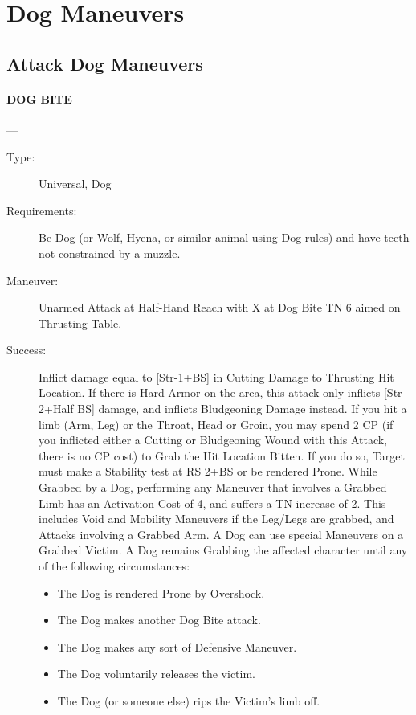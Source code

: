 \documentclass[oneside,11pt,english]{book}
\begin{document}
\section{Dog Maneuvers}
\subsection{Attack Dog Maneuvers}
\paragraph{\large\label{man:DOG BITE} DOG BITE}---\quad{\large[X]}
\vspace{-10pt}\begin{description} 
\item [Type:] Universal, Dog 
\item [Requirements:] Be Dog (or Wolf, Hyena, or similar animal using Dog rules) and have teeth not 
constrained by a muzzle. 
\item [Maneuver:] Unarmed Attack at Half-Hand Reach with X at Dog Bite TN 6 aimed on Thrusting Table. 
\item [Success:] Inflict damage equal to [Str-1+BS] in Cutting Damage to Thrusting Hit Location. If there is 
Hard Armor on the area, this attack only inflicts [Str-2+Half BS] damage, and inflicts Bludgeoning 
Damage instead. 
If you hit a limb (Arm, Leg) or the Throat, Head or Groin, you may spend 2 CP (if you inflicted either a 
Cutting or Bludgeoning Wound with this Attack, there is no CP cost) to Grab the Hit Location Bitten. If 
you do so, Target must make a Stability test at RS 2+BS or be rendered Prone. 
While Grabbed by a Dog, performing any Maneuver that involves a Grabbed Limb has an Activation 
Cost of 4, and suffers a TN increase of 2. This includes Void and Mobility Maneuvers if the Leg/Legs are 
grabbed, and Attacks involving a Grabbed Arm. A Dog can use special Maneuvers on a Grabbed Victim. 
A Dog remains Grabbing the affected character until any of the following circumstances: 
\begin{itemize}
\item The Dog is rendered Prone by Overshock. 
\item The Dog makes another Dog Bite attack. 
\item The Dog makes any sort of Defensive Maneuver. 
\item The Dog voluntarily releases the victim. 
\item The Dog (or someone else) rips the Victim’s limb off. 
\end{itemize}
\end{description}
\end{document}
